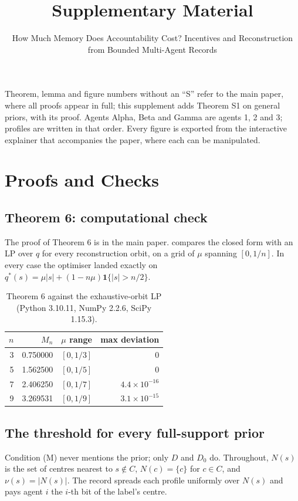 \documentclass[sigconf,anonymous,acmthm=false]{aamas}
\theoremstyle{acmplain}
\theoremstyle{acmdefinition}
\begin{document}
\title[How Much Memory Does Accountability Cost? (Supplement)]{Supplementary Material}
\subtitle{How Much Memory Does Accountability Cost? Incentives and Reconstruction from Bounded Multi-Agent Records}

\maketitle

Theorem, lemma and figure numbers without an ``S'' refer to the main paper, where all proofs appear in full; this supplement adds Theorem S1 on general priors, with its proof. Agents
\textsf{Alpha}, \textsf{Beta} and \textsf{Gamma} are agents 1, 2 and 3; profiles are written
in that order. Every figure is exported from the interactive explainer that accompanies the
paper, where each can be manipulated.

\appendix
\section{Proofs and Checks}

\subsection{Theorem 6: computational check}
The proof of Theorem 6 is in the main paper.  compares the closed form with an
LP over $q$ for every reconstruction orbit, on a grid of $\mu$ spanning $[0,1/n]$. In every case the optimiser landed exactly on
$q^*(s)=\mu|s|+(1-n\mu)\mathbf1\{|s|>n/2\}$.

\begin{table}[h]
\caption{Theorem 6 against the exhaustive-orbit LP (Python 3.10.11, NumPy 2.2.6, SciPy 1.15.3).}
\label{tab:orbit}
\footnotesize
\begin{tabular}{@{}rrlr@{}}
\toprule
$n$ & $M_n$ & $\mu$ range & max deviation\\
\midrule
3 & 0.750000 & $[0,1/3]$ & 0\\
5 & 1.562500 & $[0,1/5]$ & 0\\
7 & 2.406250 & $[0,1/7]$ & $4.4\times10^{-16}$\\
9 & 3.269531 & $[0,1/9]$ & $3.1\times10^{-15}$\\
\bottomrule
\end{tabular}
\end{table}

\subsection{The threshold for every full-support prior}
Condition (M) never mentions the prior; only $D$ and $D_0$ do. Throughout, $N(s)$ is the set of
centres nearest to $s\notin C$, $N(c)=\{c\}$ for $c\in C$, and $\nu(s)=|N(s)|$. The record
spreads each profile uniformly over $N(s)$ and pays agent $i$ the $i$-th bit of the label's
centre.
\end{document}
